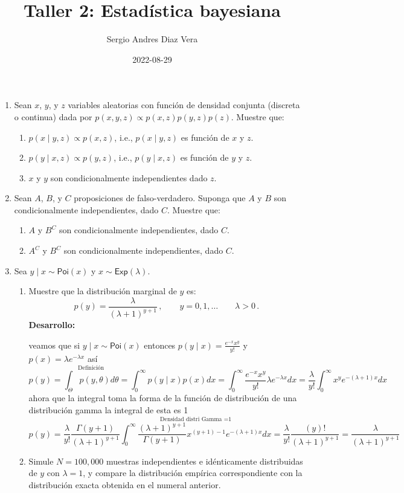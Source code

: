 \documentclass[
]{article}
\title{Taller 2: Estadística bayesiana}
\author{Sergio Andres Diaz Vera}
\date{2022-08-29}
\begin{document}
\maketitle

\begin{enumerate}

\item Sean $x$, $y$, y $z$ variables aleatorias con función de densidad conjunta (discreta o continua) dada por $p(x,y,z) \propto             p(x,z)p(y,z)p(z)$. Muestre que:
\begin{enumerate}
  \item $p(x\mid y,z)\propto p(x,z)$, i.e., $p(x\mid y,z)$ es función de $x$ y $z$.
  \item$p(y\mid x,z)\propto p(y,z)$, i.e., $p(y\mid x,z)$ es función de $y$ y $z$.    
  \item $x$ y $y$ son condicionalmente independientes dado $z$.
\end{enumerate}  
\item Sean $A$, $B$, y $C$ proposiciones de falso-verdadero. Suponga que $A$ y $B$ son condicionalmente independientes, dado $C$. Muestre que:
  \begin{enumerate}
    \item $A$   y $B^C$ son condicionalmente independientes, dado $C$.  
    \item $A^C$ y $B^C$ son condicionalmente independientes, dado $C$.
  \end{enumerate}
\item Sea $y\mid x\sim\textsf{Poi}(x)$ y $x\sim\textsf{Exp}(\lambda)$.
    \begin{enumerate}
       \item Muestre que la distribución marginal de $y$ es:
$$
p(y) = \frac{\lambda}{(\lambda+1)^{y+1}}\,,\qquad y = 0,1,\ldots\qquad\lambda>0\,.
$$
\textbf{Desarrollo:}

veamos que si $y\mid x\sim\textsf{Poi}(x)$  entonces $p(y\mid x)=\frac{e^{-x}x^{y}}{y!}$  y $p(x)=\lambda e^{-\lambda x}$ así
$$ p(y) = \stackrel{\text{Definición}}{\int_{\Theta} p(y,\theta)d \theta }=\int_{0}^{\infty}p(y \mid x)p(x)dx=\int_{0}^{\infty}\frac{e^{-x}x^{y}}{y!}\lambda e^{-\lambda  x}dx= \frac{\lambda}{y!}\int_{0}^{\infty} x^{y}e^{-(\lambda+1)x}dx$$ ahora que la integral toma la forma de la función de distribución de una distribución gamma la integral de esta es 1  
$$ p(y)=\frac{\lambda}{y!} \frac{\Gamma (y+1)}{(\lambda +1)^{y+1}}  \stackrel{\text{Densidad distri Gamma =1}}{ \int_{0}^{\infty} \frac{(\lambda +1)^{y+1}}{\Gamma (y+1)} x^{(y+1)-1}e^{-(\lambda+1)x}dx}=\frac{\lambda}{y!} \frac{(y)!}{(\lambda +1)^{y+1}}=\frac{\lambda}{(\lambda +1)^{y+1}}
$$
\item Simule $N=100,000$ muestras independientes e idénticamente distribuidas de $y$ con $\lambda = 1$, y compare la distribución empírica correspondiente con la distribución exacta obtenida en el numeral anterior.
\end{enumerate}
\end{enumerate}
\end{document}
